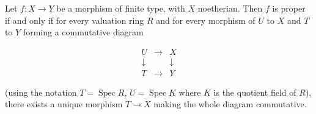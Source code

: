Let $f: X \to Y$ be a morphism of finite type, with $X$ noetherian. Then $f$ is proper if and only if for every valuation ring $R$ and for every morphism of $U$ to $X$ and $T$ to $Y$ forming a commutative diagram

$$
\begin{array}{ccc}
U & \to & X \\
\downarrow & & \downarrow \\
T & \to & Y
\end{array}
$$

(using the notation $T = \operatorname{Spec} R$, $U = \operatorname{Spec} K$ where $K$ is the quotient field of $R$), there exists a unique morphism $T \to X$ making the whole diagram commutative.
